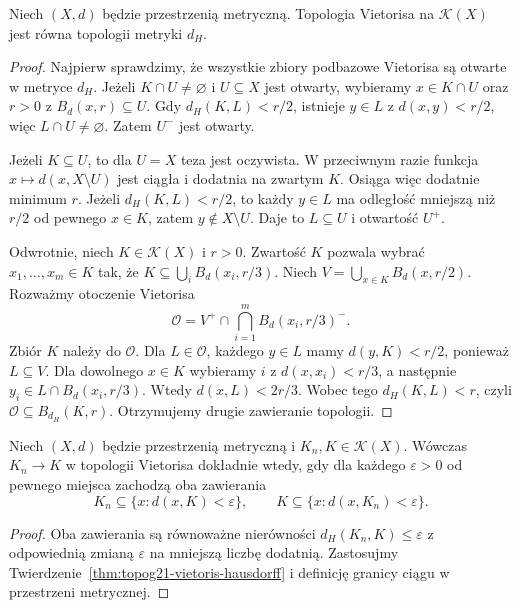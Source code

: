 \begin{twierdzenie}
\label{thm:topog21-vietoris-hausdorff}
Niech \((X,d)\) będzie przestrzenią metryczną.
Topologia Vietorisa na \(\mathcal K(X)\) jest równa
topologii metryki \(d_H\).
\end{twierdzenie}
\begin{proof}
Najpierw sprawdzimy, że wszystkie zbiory podbazowe
Vietorisa są otwarte w metryce \(d_H\).
Jeżeli \(K\cap U\neq\varnothing\) i \(U\subseteq X\)
jest otwarty, wybieramy \(x\in K\cap U\)
oraz \(r>0\) z \(B_d(x,r)\subseteq U\).
Gdy \(d_H(K,L)<r/2\), istnieje \(y\in L\)
z \(d(x,y)<r/2\), więc \(L\cap U\neq\varnothing\).
Zatem \(U^-\) jest otwarty.

Jeżeli \(K\subseteq U\), to dla \(U=X\) teza jest
oczywista. W przeciwnym razie funkcja
\(x\mapsto d(x,X\setminus U)\) jest ciągła
i dodatnia na zwartym \(K\). Osiąga więc
dodatnie minimum \(r\).
Jeżeli \(d_H(K,L)<r/2\), to każdy \(y\in L\)
ma odległość mniejszą niż \(r/2\) od pewnego
\(x\in K\), zatem \(y\notin X\setminus U\).
Daje to \(L\subseteq U\) i otwartość \(U^+\).

Odwrotnie, niech \(K\in\mathcal K(X)\) i \(r>0\).
Zwartość \(K\) pozwala wybrać \(x_1,\ldots,x_m\in K\)
tak, że \(K\subseteq\bigcup_i B_d(x_i,r/3)\).
Niech \(V=\bigcup_{x\in K}B_d(x,r/2)\).
Rozważmy otoczenie Vietorisa
\[
 \mathcal O=V^+\cap
 \bigcap_{i=1}^{m} B_d(x_i,r/3)^- .
\]
Zbiór \(K\) należy do \(\mathcal O\).
Dla \(L\in\mathcal O\), każdego \(y\in L\)
mamy \(d(y,K)<r/2\), ponieważ \(L\subseteq V\).
Dla dowolnego \(x\in K\) wybieramy \(i\)
z \(d(x,x_i)<r/3\), a następnie
\(y_i\in L\cap B_d(x_i,r/3)\).
Wtedy \(d(x,L)<2r/3\).
Wobec tego \(d_H(K,L)<r\),
czyli \(\mathcal O\subseteq B_{d_H}(K,r)\).
Otrzymujemy drugie zawieranie topologii.
\end{proof}

\begin{wniosek}
\label{cor:topog21-hausdorff-convergence}
Niech \((X,d)\) będzie przestrzenią metryczną
i \(K_n,K\in\mathcal K(X)\).
Wówczas \(K_n\to K\) w topologii Vietorisa
dokładnie wtedy, gdy dla każdego \(\varepsilon>0\)
od pewnego miejsca zachodzą oba zawierania
\[
 K_n\subseteq\{x:d(x,K)<\varepsilon\},
 \qquad
 K\subseteq\{x:d(x,K_n)<\varepsilon\}.
\]
\end{wniosek}
\begin{proof}
Oba zawierania są równoważne nierówności
\(d_H(K_n,K)\le\varepsilon\) z odpowiednią
zmianą \(\varepsilon\) na mniejszą liczbę dodatnią.
Zastosujmy Twierdzenie~\ref{thm:topog21-vietoris-hausdorff}
i definicję granicy ciągu w przestrzeni metrycznej.
\end{proof}

